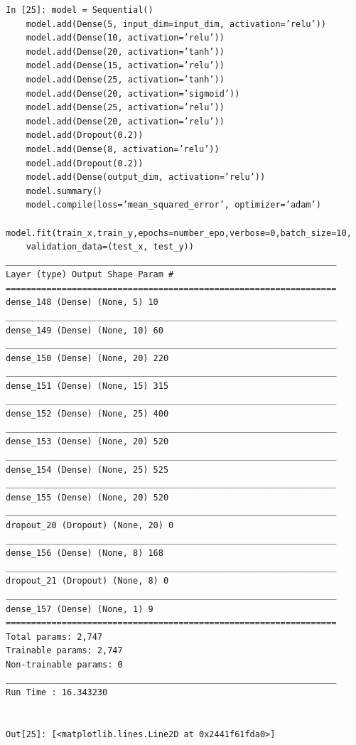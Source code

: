 \documentclass[10pt]{article}
\begin{document}
\begin{verbatim}
In [25]: model = Sequential()
    model.add(Dense(5, input_dim=input_dim, activation=’relu’))
    model.add(Dense(10, activation=’relu’))
    model.add(Dense(20, activation=’tanh’))
    model.add(Dense(15, activation=’relu’))
    model.add(Dense(25, activation=’tanh’))
    model.add(Dense(20, activation=’sigmoid’))
    model.add(Dense(25, activation=’relu’))
    model.add(Dense(20, activation=’relu’))
    model.add(Dropout(0.2))
    model.add(Dense(8, activation=’relu’))
    model.add(Dropout(0.2))
    model.add(Dense(output_dim, activation=’relu’))
    model.summary()
    model.compile(loss=’mean_squared_error’, optimizer=’adam’)
    model.fit(train_x,train_y,epochs=number_epo,verbose=0,batch_size=10,
    validation_data=(test_x, test_y))
_________________________________________________________________
Layer (type) Output Shape Param #
=================================================================
dense_148 (Dense) (None, 5) 10
_________________________________________________________________
dense_149 (Dense) (None, 10) 60
_________________________________________________________________
dense_150 (Dense) (None, 20) 220
_________________________________________________________________
dense_151 (Dense) (None, 15) 315
_________________________________________________________________
dense_152 (Dense) (None, 25) 400
_________________________________________________________________
dense_153 (Dense) (None, 20) 520
_________________________________________________________________
dense_154 (Dense) (None, 25) 525
_________________________________________________________________
dense_155 (Dense) (None, 20) 520
_________________________________________________________________
dropout_20 (Dropout) (None, 20) 0
_________________________________________________________________
dense_156 (Dense) (None, 8) 168
_________________________________________________________________
dropout_21 (Dropout) (None, 8) 0
_________________________________________________________________
dense_157 (Dense) (None, 1) 9
=================================================================
Total params: 2,747
Trainable params: 2,747
Non-trainable params: 0
_________________________________________________________________
Run Time : 16.343230


Out[25]: [<matplotlib.lines.Line2D at 0x2441f61fda0>]


\end{verbatim}
\end{document}
